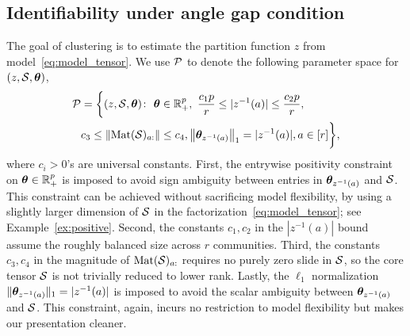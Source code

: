 \documentclass[lettersize,journal]{IEEEtran}
\theoremstyle{definition}
\theoremstyle{definition}
\begin{document}
\subsection{Identifiability under angle gap condition}
The goal of clustering is to estimate the partition function $z$ from model~\eqref{eq:model_tensor}. We use $\mathcal{P}$ to denote the following parameter space for $(z,\mathcal{S},\boldsymbol{\theta})$,
\footnotesize
\begin{align}\label{eq:family}
\tP&=\bigg\{(z,\tS,\mtheta)\colon  \ \mtheta\in\mathbb{R}^p_{+},\ 
{c_1p\over r}\leq |z^{-1}(a)|\leq {c_2 p\over r},\\& c_3\leq \onormSize{}{\text{Mat}(\tS)_{a:}}\leq c_4, \onorm{\mtheta_{z^{-1}(a)}}_1=|z^{-1}(a)|, a\in[r]\bigg\},
\end{align}
\normalsize
where $c_i>0$'s are universal constants.  
First, the entrywise positivity constraint on  $\boldsymbol{\theta}\in\mathbb{R}^p_{+}$ is imposed to avoid sign ambiguity between entries in $\boldsymbol{\theta}_{z^{-1}(a)}$ and $\mathcal{S}$. This constraint can be achieved without sacrificing model flexibility, by using a slightly larger dimension of $\mathcal{S}$ in the factorization~\eqref{eq:model_tensor}; see Example~\ref{ex:positive}. Second, 
the constants $c_1, c_2$ in the $|z^{-1}(a)|$ bound assume the roughly balanced size across $r$ communities. Third, the constants $c_3, c_4 $ in the magnitude of $\text{Mat}(\mathcal{S})_{a:}$ requires no purely zero slide in $\mathcal{S}$, so the core tensor $\mathcal{S}$ is not trivially reduced to lower rank. Lastly, the $\ell_1$ normalization $\lVert\boldsymbol{\theta}_{z^{-1}(a)}\rVert_1=|z^{-1}(a)|$ is imposed to avoid the scalar ambiguity between $\boldsymbol{\theta}_{z^{-1}(a)}$ and $\mathcal{S}$. This constraint, again, incurs no restriction to model flexibility but makes our presentation cleaner. 
\end{document}
